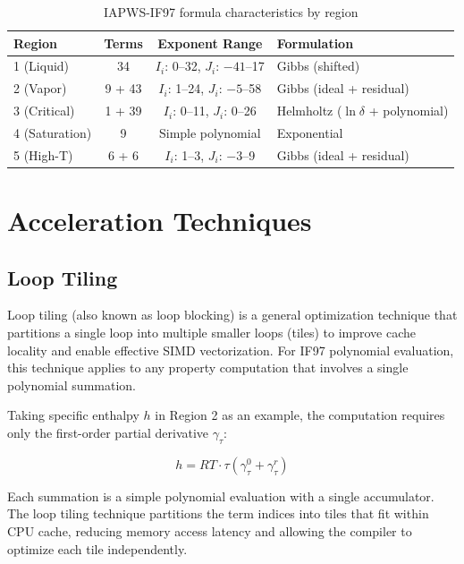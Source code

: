 \documentclass{article}
\begin{document}
\begin{table}[H]
\centering
\caption{IAPWS-IF97 formula characteristics by region}
\label{tab:formula_char}
\begin{tabular}{lccl}
\toprule
\textbf{Region} & \textbf{Terms} & \textbf{Exponent Range} & \textbf{Formulation} \\
\midrule
1 (Liquid) & 34 & $I_i$: 0--32, $J_i$: $-41$--17 & Gibbs (shifted) \\
2 (Vapor) & 9 + 43 & $I_i$: 1--24, $J_i$: $-5$--58 & Gibbs (ideal + residual) \\
3 (Critical) & 1 + 39 & $I_i$: 0--11, $J_i$: 0--26 & Helmholtz ($\ln\delta$ + polynomial) \\
4 (Saturation) & 9 & Simple polynomial & Exponential \\
5 (High-T) & 6 + 6 & $I_i$: 1--3, $J_i$: $-3$--9 & Gibbs (ideal + residual) \\
\bottomrule
\end{tabular}
\end{table}

\section{Acceleration Techniques}

\subsection{Loop Tiling}

Loop tiling (also known as loop blocking) \cite{LoopTiling,Grosser2012Polly} is a general optimization technique that partitions a single loop into multiple smaller loops (tiles) to improve cache locality and enable effective SIMD vectorization. For IF97 polynomial evaluation, this technique applies to any property computation that involves a single polynomial summation.

Taking specific enthalpy $h$ in Region 2 as an example, the computation requires only the first-order partial derivative $\gamma_\tau$:

\begin{equation}
h = RT \cdot \tau \left( \gamma^0_\tau + \gamma^r_\tau \right)
\end{equation}

Each summation is a simple polynomial evaluation with a single accumulator. The loop tiling technique partitions the term indices into tiles that fit within CPU cache, reducing memory access latency and allowing the compiler to optimize each tile independently.
\end{document}
